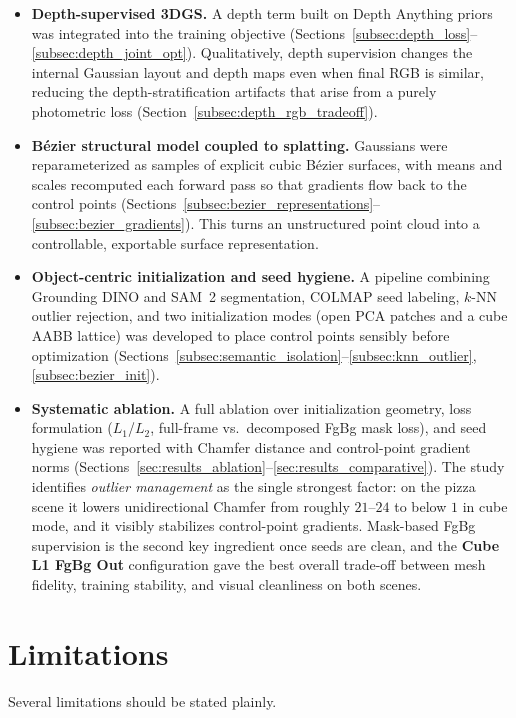 \documentclass{report}
\begin{document}
\begin{itemize}
    \item \textbf{Depth-supervised 3DGS.} A depth term built on Depth Anything priors was integrated into the training objective (Sections~\ref{subsec:depth_loss}--\ref{subsec:depth_joint_opt}). Qualitatively, depth supervision changes the internal Gaussian layout and depth maps even when final RGB is similar, reducing the depth-stratification artifacts that arise from a purely photometric loss (Section~\ref{subsec:depth_rgb_tradeoff}).
    \item \textbf{B\'ezier structural model coupled to splatting.} Gaussians were reparameterized as samples of explicit cubic B\'ezier surfaces, with means and scales recomputed each forward pass so that gradients flow back to the control points (Sections~\ref{subsec:bezier_representations}--\ref{subsec:bezier_gradients}). This turns an unstructured point cloud into a controllable, exportable surface representation.
    \item \textbf{Object-centric initialization and seed hygiene.} A pipeline combining Grounding DINO and SAM~2 segmentation, COLMAP seed labeling, $k$-NN outlier rejection, and two initialization modes (open PCA patches and a cube AABB lattice) was developed to place control points sensibly before optimization (Sections~\ref{subsec:semantic_isolation}--\ref{subsec:knn_outlier}, \ref{subsec:bezier_init}).
    \item \textbf{Systematic ablation.} A full ablation over initialization geometry, loss formulation ($L_1$/$L_2$, full-frame vs.\ decomposed FgBg mask loss), and seed hygiene was reported with Chamfer distance and control-point gradient norms (Sections~\ref{sec:results_ablation}--\ref{sec:results_comparative}). The study identifies \emph{outlier management} as the single strongest factor: on the pizza scene it lowers unidirectional Chamfer from roughly $21$--$24$ to below $1$ in cube mode, and it visibly stabilizes control-point gradients. Mask-based FgBg supervision is the second key ingredient once seeds are clean, and the \textbf{Cube L1 FgBg Out} configuration gave the best overall trade-off between mesh fidelity, training stability, and visual cleanliness on both scenes.
\end{itemize}

\section{Limitations}

Several limitations should be stated plainly.
\end{document}

